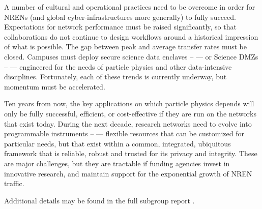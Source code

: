 A number of cultural and operational practices need to be overcome in order for NRENs (and global cyber-infrastructures more generally) to fully succeed. 
Expectations for network performance must be raised significantly, so that collaborations do not continue to design workflows around a historical impression of what is possible. 
The gap between peak and average transfer rates must be closed. 
Campuses must deploy secure science data enclaves – --- or  Science DMZs \cite{DMZ} – --- engineered for the needs of particle physics and other data-intensive disciplines.  Fortunately, each of these trends is currently underway, but momentum must be accelerated.   

Ten years from now, the key applications on which particle physics depends will only be fully successful, efficient, or cost-effective if they are run on the networks that exist today. 
During the next decade, research networks need to evolve into programmable instruments – --- flexible resources that can be customized for particular needs, but that exist within a common, integrated, ubiquitous framework that is reliable, robust and trusted for its privacy and integrity. These are major challenges, but they are tractable if funding agencies invest in innovative research, and maintain support for the exponential growth of NREN traffic. 

Additional details may be found in the full subgroup report \cite{Bell:2013fwa}.

